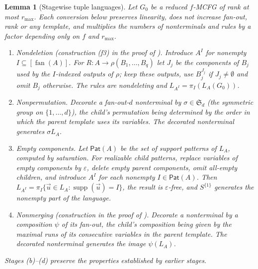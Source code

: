 \documentclass[11pt]{article}
\numberwithin{equation}{section}
\theoremstyle{plain}
\newtheorem{lemma}[theorem]{Lemma}
\theoremstyle{definition}
\theoremstyle{remark}
\newcommand{\tuple}[1]{\vec{#1}}
\newcommand{\eps}{\varepsilon}
\newcommand{\fan}{\operatorname{fan}}
\theoremstyle{plain}
\begin{document}
\begin{lemma}[Stagewise tuple languages]
\label{lem:normalization-stages}
Let $G_0$ be a reduced $f$-MCFG of rank at most $r_{\max}$.  Each conversion below
preserves linearity, does not increase fan-out, rank or any template, and multiplies the
numbers of nonterminals and rules by a factor depending only on $f$ and $r_{\max}$.
\begin{enumerate}[label=\textup{(\alph*)},leftmargin=*]
\item \emph{Nondeletion} (construction (f3) in the proof of
\cite[Lemma~2.2]{SekiEtAl1991}).  Introduce $A^I$ for nonempty $I\subseteq[\fan(A)]$.
For $R:A\to\rho(B_1,\ldots,B_q)$ let $J_j$ be the components of $B_j$ used by the
$I$-indexed outputs of $\rho$; keep these outputs, use $B_j^{J_j}$ if $J_j\ne\emptyset$
and omit $B_j$ otherwise.  The rules are nondeleting and $L_{A^I}=\pi_I(L_A(G_0))$.
\item \emph{Nonpermutation.}  Decorate a fan-out-$d$ nonterminal by
$\sigma\in\mathfrak S_d$ (the symmetric group on $\{1,\ldots,d\}$),
the child's permutation being determined by the order in which
the parent template uses its variables.  The decorated nonterminal generates
$\sigma L_A$.
\item \emph{Empty components.}  Let $\mathsf{Pat}(A)$ be the set of support patterns of
$L_A$, computed by saturation.  For realizable child patterns, replace variables of
empty components by $\eps$, delete empty parent components, omit all-empty children,
and introduce $A^I$ for each nonempty $I\in\mathsf{Pat}(A)$.  Then
$L_{A^I}=\pi_I\{\tuple u\in L_A:\operatorname{supp}(\tuple u)=I\}$, the result is
$\eps$-free, and $S^{\{1\}}$ generates the nonempty part of the language.
\item \emph{Nonmerging} (construction in the proof of
\cite[Section~2.3, Lemma~1]{Yoshinaka2011}).  Decorate a nonterminal by a composition
$\psi$ of its fan-out, the child's composition being given by the maximal runs of its
consecutive variables in the parent template.  The decorated nonterminal generates the
image $\psi(L_A)$.
\end{enumerate}
Stages (b)--(d) preserve the properties established by earlier stages.
\end{lemma}
\end{document}
